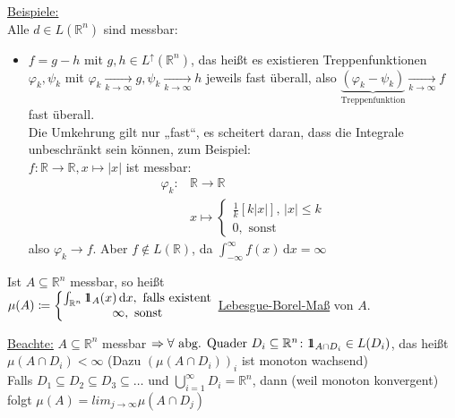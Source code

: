 \underline{Beispiele:}\\
Alle $d\in L(\mathbb{R}^n)$ sind messbar:
\begin{itemize}
    \item $f=g-h$ mit $g,h\in L^\uparrow(\mathbb{R}^n)$, das heißt es existieren Treppenfunktionen $\varphi_k, \psi_k$ mit $\varphi_k \xrightarrow[k\to\infty]{} g, \psi_k \xrightarrow[k\to \infty]{} h$ jeweils fast überall, also $\underbrace{(\varphi_k - \psi_k)}_{\text{Treppenfunktion}} \xrightarrow[k\to \infty]{} f$ fast überall.\\
    Die Umkehrung gilt nur „fast“, es scheitert daran, dass die Integrale unbeschränkt sein können, zum Beispiel:\\
    $f\colon \mathbb{R}\to\mathbb{R}, x\mapsto |x|$ ist messbar: \begin{align*}
        \varphi_k\colon & \mathbb{R} \to \mathbb{R}\\
        & x \mapsto \left\{\begin{matrix}
            \frac{1}{k} [k|x|], \, |x| \leq k\\
            0, \text{ sonst}
        \end{matrix}\right.
    \end{align*}
    also $\varphi_k\to f$. Aber $f\notin L(\mathbb{R})$, da $\int_{-\infty}^{\infty} f(x) \, \text{d}x = \infty$
\end{itemize}

\begin{definition}
    Ist $A\subseteq \mathbb{R}^n$ messbar, so heißt \\
    $\mu (A)\coloneqq \left\{\begin{matrix*}
        \int_{\mathbb{R}^n} \id_A (x) \, \text{d}x, \text{ falls existent}\\
        \infty, \text{ sonst}
    \end{matrix*}\right.$
    \underline{Lebesgue-Borel-Maß} von $A$.

    \underline{Beachte:} $A\subseteq \mathbb{R}^n$ messbar $\Rightarrow \forall \text{ abg. Quader } D_i \subseteq \mathbb{R}^n\colon \id_{A\cap D_i}\in L(D_i)$, das heißt $\mu (A \cap D_i) < \infty$ (Dazu $(\mu (A \cap D_i))_i$ ist monoton wachsend)\\
    Falls $D_1 \subseteq D_2 \subseteq D_3 \subseteq \dots$ und $\bigcup_{i=1}^{\infty} D_i = \mathbb{R}^n$, dann (weil monoton konvergent) folgt $\mu (A) = lim_{j\to\infty} \mu (A\cap D_j)$
\end{definition}

